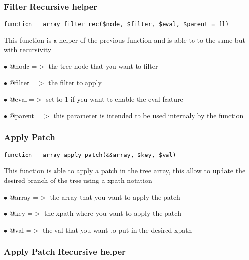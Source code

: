\documentclass[a4paper]{article}
\begin{document}
\hypertarget{toc60}{}
\subsubsection{Filter Recursive helper}

\begin{lstlisting}
function __array_filter_rec($node, $filter, $eval, $parent = [])
\end{lstlisting}

This function is a helper of the previous function and is able to to the
same but with recursivity

\begin{compactitem}
\item[\color{myblue}$\bullet$] @node   =$>$ the tree node that you want to filter
\item[\color{myblue}$\bullet$] @filter =$>$ the filter to apply
\item[\color{myblue}$\bullet$] @eval   =$>$ set to 1 if you want to enable the eval feature
\item[\color{myblue}$\bullet$] @parent =$>$ this parameter is intended to be used internaly by the function
\end{compactitem}

\hypertarget{toc61}{}
\subsubsection{Apply Patch}

\begin{lstlisting}
function __array_apply_patch(&$array, $key, $val)
\end{lstlisting}

This function is able to apply a patch in the tree array, this allow to
update the desired branch of the tree using a xpath notation

\begin{compactitem}
\item[\color{myblue}$\bullet$] @array =$>$ the array that you want to apply the patch
\item[\color{myblue}$\bullet$] @key   =$>$ the xpath where you want to apply the patch
\item[\color{myblue}$\bullet$] @val   =$>$ the val that you want to put in the desired xpath
\end{compactitem}

\hypertarget{toc62}{}
\subsubsection{Apply Patch Recursive helper}
\end{document}
